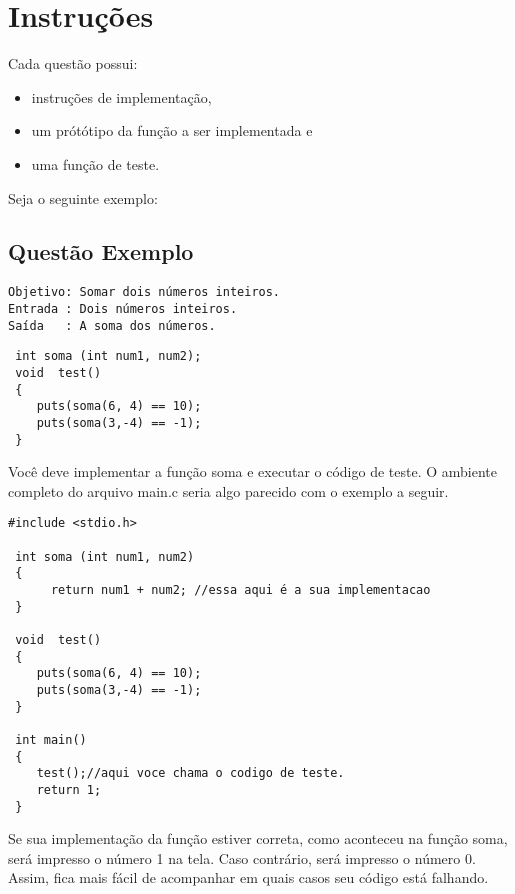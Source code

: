 \clearpage
\section*{Instruções}
Cada questão possui: 
  \begin{itemize}
  \item instruções de implementação, 
  \item um prótótipo da função a ser implementada e 
  \item uma função de teste.
  \end{itemize}

                      
Seja o seguinte exemplo:
\subsection*{Questão Exemplo}
\begin{verbatim}
Objetivo: Somar dois números inteiros.
Entrada : Dois números inteiros.
Saída   : A soma dos números.
\end{verbatim}

\begin{lstlisting}
 int soma (int num1, num2);
 void  test()
 {
    puts(soma(6, 4) == 10);
    puts(soma(3,-4) == -1);
 }
\end{lstlisting}

Você deve implementar a função soma e executar o código de teste. O ambiente completo do arquivo main.c seria
algo parecido com o exemplo a seguir.

\begin{lstlisting}
#include <stdio.h>

 int soma (int num1, num2)
 {
      return num1 + num2; //essa aqui é a sua implementacao
 }
 
 void  test()
 {
    puts(soma(6, 4) == 10);
    puts(soma(3,-4) == -1);
 }
 
 int main()
 {
    test();//aqui voce chama o codigo de teste.
    return 1;
 }
\end{lstlisting}

Se sua implementação da função estiver correta, como aconteceu na função soma, será impresso o número 1 na tela. Caso contrário, 
será impresso o número 0. Assim, fica mais fácil de acompanhar em quais casos seu código está falhando.


\tableofcontents{}
